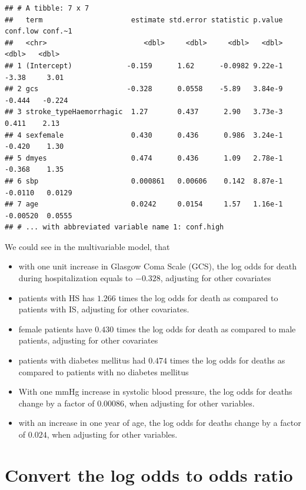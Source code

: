 \documentclass[
  10pt,
]{krantz}
\providecommand{\tightlist}{%
  \setlength{\itemsep}{0pt}\setlength{\parskip}{0pt}}
\begin{document}
\begin{verbatim}
## # A tibble: 7 x 7
##   term                     estimate std.error statistic p.value conf.low conf.~1
##   <chr>                       <dbl>     <dbl>     <dbl>   <dbl>    <dbl>   <dbl>
## 1 (Intercept)             -0.159      1.62      -0.0982 9.22e-1 -3.38     3.01  
## 2 gcs                     -0.328      0.0558    -5.89   3.84e-9 -0.444   -0.224 
## 3 stroke_typeHaemorrhagic  1.27       0.437      2.90   3.73e-3  0.411    2.13  
## 4 sexfemale                0.430      0.436      0.986  3.24e-1 -0.420    1.30  
## 5 dmyes                    0.474      0.436      1.09   2.78e-1 -0.368    1.35  
## 6 sbp                      0.000861   0.00606    0.142  8.87e-1 -0.0110   0.0129
## 7 age                      0.0242     0.0154     1.57   1.16e-1 -0.00520  0.0555
## # ... with abbreviated variable name 1: conf.high
\end{verbatim}

We could see in the multivariable model, that

\begin{itemize}
\tightlist
\item
  with one unit increase in Glasgow Coma Scale (GCS), the log odds for death during hospitalization equals to \(-0.328\), adjusting for other covariates
\item
  patients with HS has \(1.266\) times the log odds for death as compared to patients with IS, adjusting for other covariates.
\item
  female patients have \(0.430\) times the log odds for death as compared to male patients, adjusting for other covariates
\item
  patients with diabetes mellitus had \(0.474\) times the log odds for deaths as compared to patients with no diabetes mellitus
\item
  With one mmHg increase in systolic blood pressure, the log odds for deaths change by a factor of \(0.00086\), when adjusting for other variables.\\
\item
  with an increase in one year of age, the log odds for deaths change by a factor of \(0.024\), when adjusting for other variables.
\end{itemize}

\hypertarget{convert-the-log-odds-to-odds-ratio}{%
\section{\texorpdfstring{Convert the log odds to odds ratio}{Convert the log odds to odds ratio}}\label{convert-the-log-odds-to-odds-ratio}}
\end{document}
